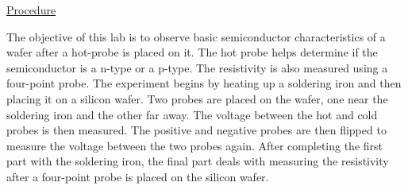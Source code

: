 \underline{Procedure}

The objective of this lab is to observe basic semiconductor characteristics of a wafer after a hot-probe is placed on it. The hot probe helps determine if the semiconductor is a n-type or a p-type. The resistivity is also measured using a four-point probe. The experiment begins by heating up a soldering iron and then placing it on a silicon wafer. Two probes are placed on the wafer, one near the soldering iron and the other far away. The voltage between the hot and cold probes is then measured. The positive and negative probes are then flipped to measure the voltage between the two probes again. After completing the first part with the soldering iron, the final part deals with measuring the resistivity after a four-point probe is placed on the silicon wafer. \\


